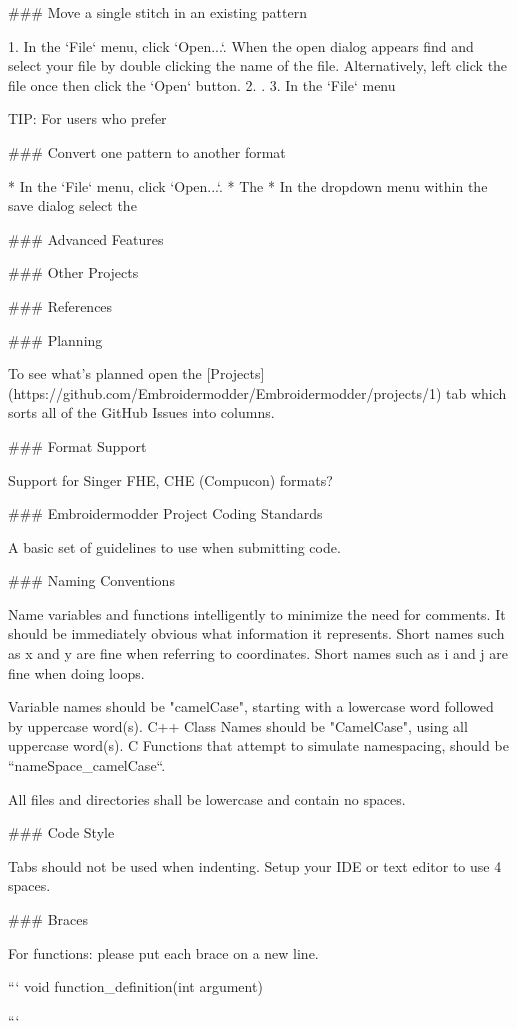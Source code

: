 ### Move a single stitch in an existing pattern

1. In the `File` menu, click `Open...`. When the open dialog appears find and select your file by double clicking the name of the file. Alternatively, left click the file once then click the `Open` button.
2. .
3. In the `File` menu

TIP: For users who prefer

### Convert one pattern to another format

* In the `File` menu, click `Open...`.
* The
* In the dropdown menu within the save dialog select the

### Advanced Features

### Other Projects

### References

### Planning

To see what's planned open the
[Projects](https://github.com/Embroidermodder/Embroidermodder/projects/1)
tab which sorts all of the GitHub Issues into columns.

### Format Support

Support for Singer FHE, CHE (Compucon) formats?

### Embroidermodder Project Coding Standards

A basic set of guidelines to use when submitting code.

### Naming Conventions

Name variables and functions intelligently to minimize the need for
comments. It should be immediately obvious what information it
represents. Short names such as x and y are fine when referring to
coordinates. Short names such as i and j are fine when doing loops.

Variable names should be "camelCase", starting with a lowercase word
followed by uppercase word(s). C++ Class Names should be "CamelCase",
using all uppercase word(s). C Functions that attempt to simulate namespacing,
should be ``nameSpace\_camelCase``.

All files and directories shall be lowercase and contain no spaces.

### Code Style

Tabs should not be used when indenting. Setup your IDE or text editor to use 4 spaces.

### Braces

For functions: please put each brace on a new line.

```
void function\_definition(int argument)
{

}
```

